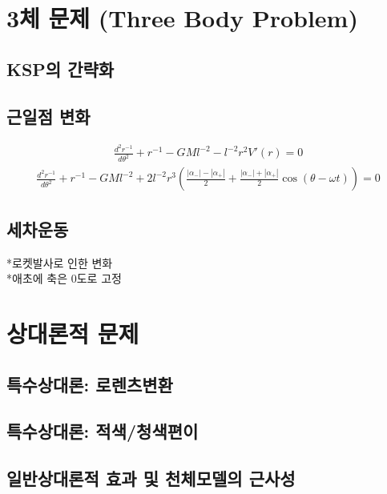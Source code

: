 \documentclass[9pt,twoside,openany]{amsbook}
\begin{document}
\chapter{3체 문제 (Three Body Problem)}
\section{KSP의 간략화}
\section{근일점 변화}
\begin{align}
	\frac{d^2r^{-1}}{d\theta^2}+r^{-1}-GMl^{-2}-l^{-2}r^2V'(r) = 0
\end{align}
\begin{align}
	\frac{d^2r^{-1}}{d\theta^2}+r^{-1}-GMl^{-2}+2 l^{-2}r^3 \left(\frac{|\alpha_-| -|\alpha_+|}{2}+\frac{|\alpha_-| +|\alpha_+|}{2}\cos(\theta-\omega t)\right)= 0
\end{align}


\section{세차운동}
*로켓발사로 인한 변화
\\*애초에 축은 0도로 고정
\chapter{상대론적 문제}
\section{특수상대론: 로렌츠변환}
\section{특수상대론: 적색/청색편이}
\section{일반상대론적 효과 및 천체모델의 근사성}



\backmatter
\backpage
\end{document}
